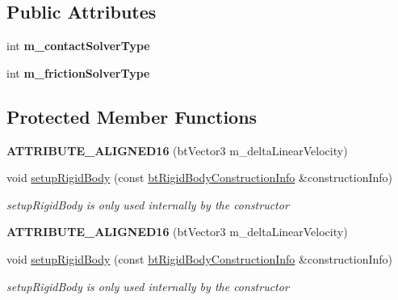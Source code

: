 \subsection*{Public Attributes}
\begin{DoxyCompactItemize}
\item 
\mbox{\label{classbtRigidBody_a4673a548621e61ef66364a461ad21947}} 
int {\bfseries m\+\_\+contact\+Solver\+Type}
\item 
\mbox{\label{classbtRigidBody_a322471bd51e8fd0a383a38a3611c7256}} 
int {\bfseries m\+\_\+friction\+Solver\+Type}
\end{DoxyCompactItemize}
\subsection*{Protected Member Functions}
\begin{DoxyCompactItemize}
\item 
\mbox{\label{classbtRigidBody_a2b1b5fe723354ad55c1412e52372b053}} 
{\bfseries A\+T\+T\+R\+I\+B\+U\+T\+E\+\_\+\+A\+L\+I\+G\+N\+E\+D16} (bt\+Vector3 m\+\_\+delta\+Linear\+Velocity)
\item 
\mbox{\label{classbtRigidBody_adaa57210b4f5388b63a11db376358dd0}} 
void \hyperlink{classbtRigidBody_adaa57210b4f5388b63a11db376358dd0}{setup\+Rigid\+Body} (const \hyperlink{structbtRigidBody_1_1btRigidBodyConstructionInfo}{bt\+Rigid\+Body\+Construction\+Info} \&construction\+Info)
\begin{DoxyCompactList}\small\item\em setup\+Rigid\+Body is only used internally by the constructor \end{DoxyCompactList}\item 
\mbox{\label{classbtRigidBody_a2b1b5fe723354ad55c1412e52372b053}} 
{\bfseries A\+T\+T\+R\+I\+B\+U\+T\+E\+\_\+\+A\+L\+I\+G\+N\+E\+D16} (bt\+Vector3 m\+\_\+delta\+Linear\+Velocity)
\item 
\mbox{\label{classbtRigidBody_adaa57210b4f5388b63a11db376358dd0}} 
void \hyperlink{classbtRigidBody_adaa57210b4f5388b63a11db376358dd0}{setup\+Rigid\+Body} (const \hyperlink{structbtRigidBody_1_1btRigidBodyConstructionInfo}{bt\+Rigid\+Body\+Construction\+Info} \&construction\+Info)
\begin{DoxyCompactList}\small\item\em setup\+Rigid\+Body is only used internally by the constructor \end{DoxyCompactList}\end{DoxyCompactItemize}
